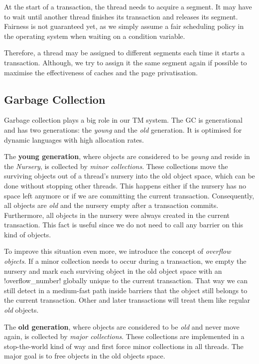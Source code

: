 \documentclass{sigplanconf}
\makeatletter
\renewcommand\lstinline[1][]{%
  \Collectverb{\@@myverb}%
}
\def\@@myverb#1{%
    \begingroup
    \fboxsep=0.2em
    \colorbox{verylightgray}{\oldlstinline|#1|}%
    \endgroup
}
\makeatother
\begin{document}
At the start of a transaction, the thread needs to acquire a
segment. It may have to wait until another thread finishes its
transaction and releases its segment. Fairness is not guaranteed yet, as
we simply assume a fair scheduling policy in the operating system when
waiting on a condition variable.

Therefore, a thread may be assigned to different segments each time it
starts a transaction. Although, we try to assign it the same segment
again if possible to maximise the effectiveness of caches and the
page privatisation.



\subsection{Garbage Collection}

Garbage collection plays a big role in our TM system. The GC is
generational and has two generations: the \emph{young} and the
\emph{old} generation. It is optimised for dynamic languages with
high allocation rates.

The \textbf{young generation}, where objects are considered to be
\emph{young} and reside in the \emph{Nursery}, is collected by
\emph{minor collections}. These collections move the surviving objects
out of a thread's nursery into the old object space, which can be done
without stopping other threads. This happens either if the nursery has
no space left anymore or if we are committing the current
transaction. Consequently, all objects are \emph{old} and the nursery empty
after a transaction commits.  Furthermore, all objects in the nursery
were always created in the current transaction. This fact is useful
since we do not need to call any barrier on this kind of objects.

To improve this situation even more, we introduce the concept of
\emph{overflow objects}. If a minor collection needs to occur during a
transaction, we empty the nursery and mark each surviving object in
the old object space with an \lstinline!overflow_number!  globally
unique to the current transaction. That way we can still detect in a
medium-fast path inside barriers that the object still belongs to the
current transaction. Other and later transactions will treat them
like regular \emph{old} objects.

The \textbf{old generation}, where objects are considered to be
\emph{old} and never move again, is collected by \emph{major
  collections}.  These collections are implemented in a stop-the-world
kind of way and first force minor collections in all threads. The
major goal is to free objects in the old objects space.
\end{document}
